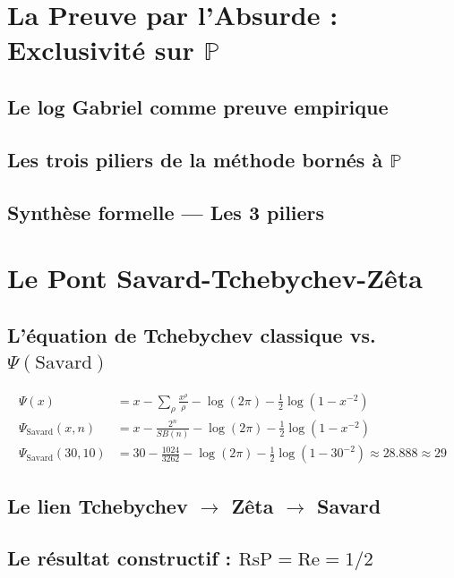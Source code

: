 \documentclass[11pt,a4paper]{article}
\begin{document}
\section{La Preuve par l'Absurde : Exclusivité sur $\mathbb{P}$}

\subsection{Le log Gabriel comme preuve empirique}
\subsection{Les trois piliers de la méthode bornés à $\mathbb{P}$}
\subsection{Synthèse formelle --- Les 3 piliers}

\section{Le Pont Savard-Tchebychev-Zêta}

\subsection{L'équation de Tchebychev classique vs. $\Psi(\text{Savard})$}
\begin{align}
\Psi(x)                &= x - \sum_{\rho} \frac{x^\rho}{\rho} - \log(2\pi) - \frac{1}{2}\log(1 - x^{-2}) \\
\Psi_{\text{Savard}}(x, n) &= x - \frac{2^n}{SB(n)} - \log(2\pi) - \frac{1}{2}\log(1 - x^{-2}) \\
\Psi_{\text{Savard}}(30, 10) &= 30 - \frac{1024}{3262} - \log(2\pi) - \frac{1}{2}\log(1 - 30^{-2}) \approx 28.888 \approx 29
\end{align}

\subsection{Le lien Tchebychev $\to$ Zêta $\to$ Savard}
\subsection{Le résultat constructif : $\text{RsP} = \text{Re} = 1/2$}
\end{document}
